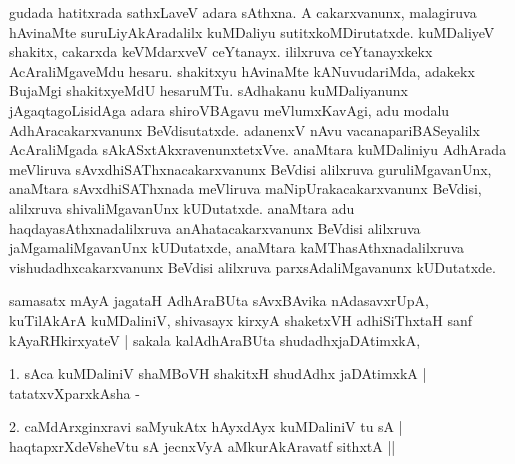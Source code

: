 \begin{entry}
{{  gudada hatitxrada sathxLaveV adara sAthxna. A cakarxvanunx,
  malagiruva hAvinaMte suruLiyAkAradalilx kuMDaliyu
  sutitxkoMDirutatxde. kuMDaliyeV shakitx, cakarxda keVMdarxveV
  ceYtanayx. ililxruva ceYtanayxkekx AcAraliMgaveMdu hesaru. shakitxyu
hAvinaMte kANuvudariMda, adakekx BujaMgi shakitxyeMdU
hesaruMTu. sAdhakanu kuMDaliyanunx jAgaqtagoLisidAga adara
shiroVBAgavu meVlumxKavAgi, adu modalu AdhAra\-cakarxvanunx
BeVdisutatxde. adanenxV nAvu vacanapariBASeyalilx AcAra\-liMgada
sAkASxtAkxravenunxtetxVve. anaMtara kuMDaliniyu AdhArada meVliruva
sAvxdhiSAThxnacakarxvanunx BeVdisi alilxruva guruliMgavanUnx,
anaMtara sAvxdhi\-SAThx\-nada meVliruva maNipUrakacakarxvanunx BeVdisi,
alilxruva shivaliMgavanUnx kUDutatxde. anaMtara adu
haqdayasAthxnadalilxruva anAhatacakarxvanunx BeVdisi alilxruva
jaMgamaliMgavanUnx kUDutatxde, anaMtara kaMThasAthxnadalilxruva
vishudadhxcakarxvanunx BeVdisi alilxruva parxsAdaliMgavanunx
kUDutatxde.}}
\smallskip
\begin{shl}
samasatx mAyA jagataH AdhAraBUta sAvxBAvika nAdasavxrUpA,\\
kuTilAkArA kuMDaliniV, shivasayx kirxyA shaketxVH adhiSiThxtaH sanf\\
kAyaRHkirxyateV | sakala kalAdhAraBUta shudadhxjaDAtimxkA,
\end{shl}
\smallskip
\begin{shl}
1. sAca kuMDaliniV shaMBoVH shakitxH shudAdhx jaDAtimxkA | tatatxvXparxkAsha -
\end{shl}
\smallskip
\begin{shl}
2. caMdArxginxravi saMyukAtx hAyxdAyx kuMDaliniV tu sA |\\
haqtapxrXdeVsheVtu sA jecnxVyA aMkurAkAravatf sithxtA ||
\end{shl}
\smallskip
{}
\smallskip
\begin{shl}

\end{shl}
\end{entry}
